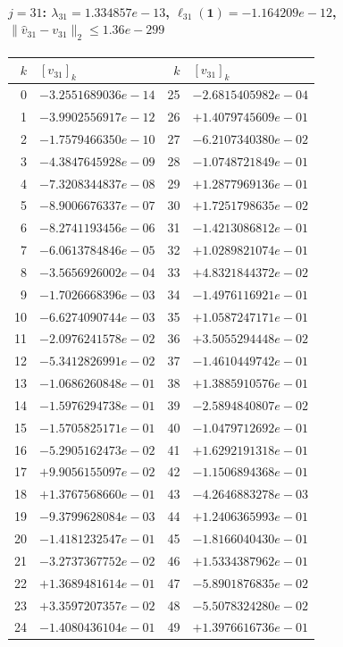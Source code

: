\paragraph{$j = 31$: $\lambda_{31} = 1.334857e-13$, \quad $\ell_{31}(\mathbf{1}) = -1.164209e-12$, \quad $\|\hat{v}_{31} - v_{31}\|_2 \leq 1.36e-299$}
\begin{center}
{\footnotesize
\begin{tabular}{r@{\;\;}l@{\quad}r@{\;\;}l}
\toprule
$k$ & $[v_{31}]_k$ & $k$ & $[v_{31}]_k$ \\
\midrule
0 & $-3.2551689036e-14$ & 25 & $-2.6815405982e-04$ \\
1 & $-3.9902556917e-12$ & 26 & $+1.4079745609e-01$ \\
2 & $-1.7579466350e-10$ & 27 & $-6.2107340380e-02$ \\
3 & $-4.3847645928e-09$ & 28 & $-1.0748721849e-01$ \\
4 & $-7.3208344837e-08$ & 29 & $+1.2877969136e-01$ \\
5 & $-8.9006676337e-07$ & 30 & $+1.7251798635e-02$ \\
6 & $-8.2741193456e-06$ & 31 & $-1.4213086812e-01$ \\
7 & $-6.0613784846e-05$ & 32 & $+1.0289821074e-01$ \\
8 & $-3.5656926002e-04$ & 33 & $+4.8321844372e-02$ \\
9 & $-1.7026668396e-03$ & 34 & $-1.4976116921e-01$ \\
10 & $-6.6274090744e-03$ & 35 & $+1.0587247171e-01$ \\
11 & $-2.0976241578e-02$ & 36 & $+3.5055294448e-02$ \\
12 & $-5.3412826991e-02$ & 37 & $-1.4610449742e-01$ \\
13 & $-1.0686260848e-01$ & 38 & $+1.3885910576e-01$ \\
14 & $-1.5976294738e-01$ & 39 & $-2.5894840807e-02$ \\
15 & $-1.5705825171e-01$ & 40 & $-1.0479712692e-01$ \\
16 & $-5.2905162473e-02$ & 41 & $+1.6292191318e-01$ \\
17 & $+9.9056155097e-02$ & 42 & $-1.1506894368e-01$ \\
18 & $+1.3767568660e-01$ & 43 & $-4.2646883278e-03$ \\
19 & $-9.3799628084e-03$ & 44 & $+1.2406365993e-01$ \\
20 & $-1.4181232547e-01$ & 45 & $-1.8166040430e-01$ \\
21 & $-3.2737367752e-02$ & 46 & $+1.5334387962e-01$ \\
22 & $+1.3689481614e-01$ & 47 & $-5.8901876835e-02$ \\
23 & $+3.3597207357e-02$ & 48 & $-5.5078324280e-02$ \\
24 & $-1.4080436104e-01$ & 49 & $+1.3976616736e-01$ \\
\bottomrule
\end{tabular}
}
\end{center}

